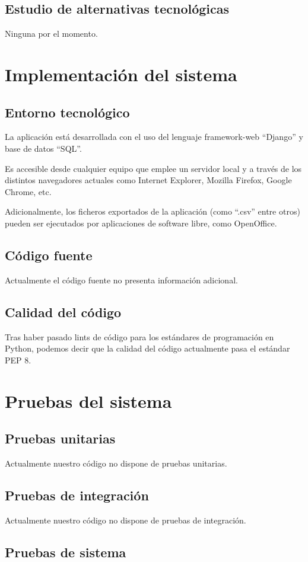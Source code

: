 \documentclass[12pt,letterpaper]{report}
\begin{document}
	\subsection{Estudio de alternativas tecnológicas}
		Ninguna por el momento.
\section{Implementación del sistema}
	\subsection{Entorno tecnológico}
	La aplicación está desarrollada con el uso del lenguaje framework-web “Django” y base de datos “SQL”.

Es accesible desde cualquier equipo que emplee un servidor local y a través de los distintos navegadores actuales como Internet Explorer, Mozilla Firefox, Google Chrome, etc.

Adicionalmente, los ficheros exportados de la aplicación (como “.csv” entre otros) pueden ser ejecutados por aplicaciones de software libre, como OpenOffice.
	\subsection{Código fuente}
	Actualmente el código fuente no presenta información adicional.
	\subsection{Calidad del código}
	Tras haber pasado lints de código para los estándares de programación en Python,
	podemos decir que la calidad del código actualmente pasa el estándar PEP 8.
\section{Pruebas del sistema}
	\subsection{Pruebas unitarias}
	Actualmente nuestro código no dispone de pruebas unitarias.
	\subsection{Pruebas de integración}
	Actualmente nuestro código no dispone de pruebas de integración.
	\subsection{Pruebas de sistema}
\end{document}
